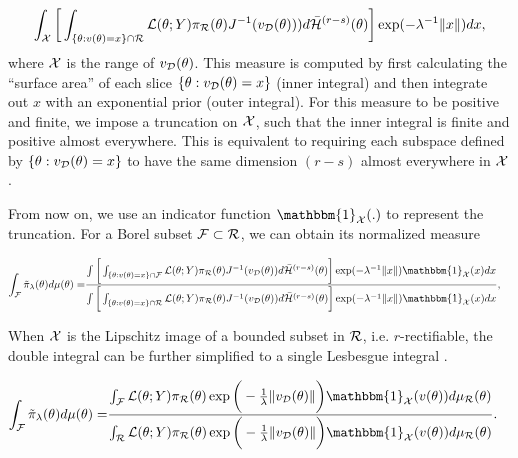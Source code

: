 \documentclass[10pt,fleqn]{article}
\DeclareMathOperator{\1}{\mathbbm{1}} \DeclareMathOperator{\bigO}{\mc O}
\begin{document}
{$$
{\int_{\mathcal{X}}
\bigg[ \int_{ \{\theta:v(\theta)=x\} \cap \mathcal{R} }
{\mathcal{L}(\theta;Y)\pi_\mathcal{R}(\theta)}{J^{-1}(v_\mathcal{D}(\theta))
)}
d\bar{\mathcal{H}}^{(r-s)}(\theta) \bigg]     \exp(-{\lambda^{-1}}\|x\|)    dx
},
$$
where $\mathcal{X}$ is the range of $v_{\mathcal{D}}(\theta)$. This measure is computed by first calculating the ``surface area'' of each slice
$\{\theta:v_{\mathcal{D}}(\theta)=x\}$ (inner integral) and then integrate out $x$ with an exponential
prior (outer integral). For this measure to be positive and finite, we impose a
truncation on $\mathcal{X}$, such that the inner integral is finite and positive
almost everywhere. This is equivalent to requiring each subspace defined
by $\{\theta:v_{\mathcal{D}}(\theta)=x\}$  to have the same dimension $(r-s)$ almost
everywhere in $\mathcal{X}$.

From now on, we use an indicator function $\mathbbm{1}_{\mc X}(.)$ to represent the truncation.
For a Borel subset $\mathcal{F} \subset \mathcal{R}$, we can obtain its normalized measure

\begin{equation}
\begin{aligned}
\int_{\mc F} \tilde{\pi}_\lambda(\theta) d \mu(\theta)= & \frac{\int
\bigg[ \int_{ \{\theta:v(\theta)=x\}\cap \mc F }
{\mathcal{L}(\theta;Y)\pi_\mathcal{R}(\theta)}{J^{-1}(v_\mathcal{D}(\theta))
}
d\bar{\mathcal{H}}^{(r-s)}(\theta) \bigg]  \exp(-{\lambda^{-1}}\|x\|) \mathbbm{1}_{\mc X}(x) dx
}
{\int\bigg[ \int_{ \{\theta:v(\theta)=x\} \cap \mc R}
{\mathcal{L}(\theta;Y)\pi_\mathcal{R}(\theta)}{J^{-1}(v_\mathcal{D}(\theta))
}
d\bar{\mathcal{H}}^{(r-s)}(\theta) \bigg]     \exp(-{\lambda^{-1}}\|x\|)   \mathbbm{1}_{\mc X}(x) dx
},
\end{aligned}
\end{equation}

When $\mathcal{X}$ is the Lipschitz image of a bounded subset in $\mathcal{R}$, i.e. $r$-rectifiable, the double integral  can be further simplified to a single Lesbesgue integral \citep{federer2014geometric}.


\begin{equation}
\begin{aligned}
\int_{\mc F} \tilde{\pi}_\lambda(\theta) d \mu(\theta) 
= & \frac{\int_\mathcal{F} \mathcal{L}(\theta;Y)
\pi_\mathcal{R}(\theta)\exp\bigg(-\frac{1}{\lambda}\|v_\mathcal{D}(\theta)\|\bigg)
\mathbbm{1}_{\mc X}(v(\theta)) d\mu_\mathcal{R}(\theta)}
{\int_\mathcal{R} \mathcal{L}(\theta;Y)
\pi_\mathcal{R}(\theta)\exp\bigg(-\frac{1}{\lambda}\|v_\mathcal{D}(\theta)\|\bigg)
\mathbbm{1}_{\mc X}(v(\theta)) d\mu_\mathcal{R}(\theta)}.
\end{aligned}
\end{equation}

}
\end{document}
